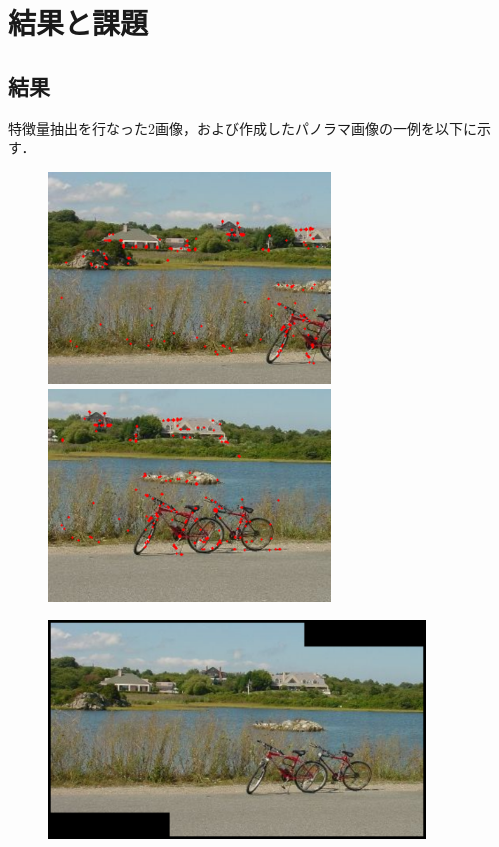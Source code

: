 \section{結果と課題}

\subsection{結果}
特徴量抽出を行なった2画像，および作成したパノラマ画像の一例を以下に示す．\par
\begin{figure}[H]
    \begin{minipage}{0.5\hsize}
        \begin{center}
            \includegraphics[width=75mm]{./figures/overview/fig2.eps}
        \end{center}
    \end{minipage}
    \begin{minipage}{0.5\hsize}
        \begin{center}
            \includegraphics[width=75mm]{./figures/overview/fig3.eps}
        \end{center}
    \end{minipage}
\end{figure}
\begin{figure}[H]
    \begin{center}
        \includegraphics[width=100mm]{./figures/overview/fig4.eps}
    \end{center}
\end{figure}
